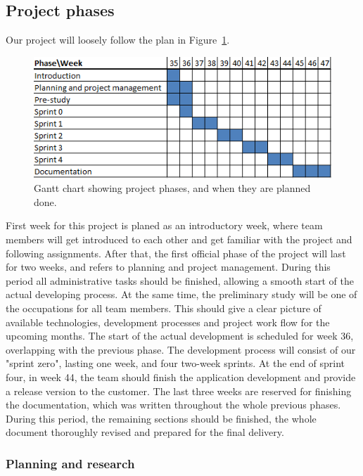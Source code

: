 \subsection{Project phases}
Our project will loosely follow the plan in Figure~\ref{gantt:project}.

\begin{figure}[h]
\centering
  \includegraphics[width=1.0\textwidth]{project_management/project_effort_estimation}
  \caption[Gantt chart of project phases]{Gantt chart showing project phases, and when they are planned done.}
  \label{gantt:project}
\end{figure}
First week for this project is planed as an introductory week, where team members will get introduced to each other and get familiar with the project and following assignments.
After that, the first official phase of the project will last for two weeks, and refers to planning and project management. 
During this period all administrative tasks should be finished, allowing a smooth start of the actual developing process. 
At the same time, the preliminary study will be one of the occupations for all team members. 
This should give a clear picture of available technologies, development processes and project work flow for the upcoming months.
The start of the actual development is scheduled for week 36, overlapping with the previous phase. 
The development process will consist of our "sprint zero", lasting one week, and four two-week sprints. 
At the end of sprint four, in week 44, the team should finish the application development and provide a release version to the customer.
The last three weeks are reserved for finishing the documentation, which was written throughout the whole previous phases. 
During this period, the remaining sections should be finished, the whole document thoroughly revised and prepared for the final delivery.

\subsubsection{Planning and research}

